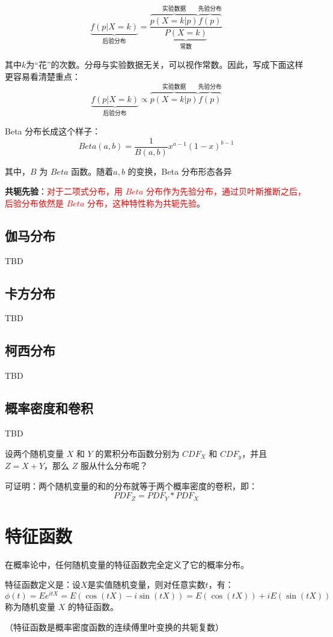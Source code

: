 \documentclass[12pt]{article}
\begin{document}
$$
\underbrace{f(p|X=k)}_{\text{后验分布}}= \frac{\overbrace{p(X=k|p)}^{\text{实验数据}}\overbrace{f(p)}^{\text{先验分布}}}{\underbrace{P(X=k)}_{\text{常数}}}
$$

其中$k$为“花”的次数。分母与实验数据无关，可以视作常数。因此，写成下面这样更容易看清楚重点：
$$
\underbrace{f(p|X=k)}_{\text{后验分布}} \propto \overbrace{p(X=k|p)}^{\text{实验数据}}\overbrace{f(p)}^{\text{先验分布}}
$$

Beta 分布长成这个样子：
$$
Beta(a,b) = \frac{1}{B(a,b)}x^{a-1}(1-x)^{b-1}
$$

其中，$B$ 为 $Beta$ 函数。随着$a,b$ 的变换，Beta 分布形态各异

\textbf{共轭先验}：\textcolor{red}{对于二项式分布，用 $Beta$ 分布作为先验分布，通过贝叶斯推断之后，后验分布依然是 $Beta$ 分布，这种特性称为共轭先验}。

\subsection{伽马分布}
TBD

\subsection{卡方分布}
TBD

\subsection{柯西分布}
TBD

\subsection{概率密度和卷积\cite{Think_Stats}}
TBD

设两个随机变量 $X$ 和 $Y$ 的累积分布函数分别为 $CDF_X$ 和 $CDF_y$，并且 $Z = X + Y$，那么 $Z$ 服从什么分布呢？

可证明：两个随机变量的和的分布就等于两个概率密度的卷积，即：
$$
PDF_Z = PDF_Y * PDF_X
$$

\section{特征函数}
在概率论中，任何随机变量的特征函数完全定义了它的概率分布。

特征函数定义是：设$X$是实值随机变量，则对任意实数$t$，有：
$$
\phi(t) = Ee^{itX} = E(\cos{(tX)} - i\sin{(tX)}) = E(\cos{(tX)}) + iE(\sin{(tX)})
$$
称为随机变量 $X$ 的特征函数。

（特征函数是概率密度函数的连续傅里叶变换的共轭复数）
\end{document}
